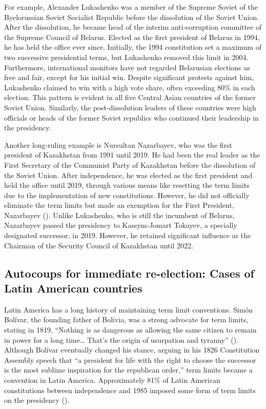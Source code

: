 \documentclass[
  12pt,
]{report}
\begin{document}
For example, Alexander Lukashenko was a member of the Supreme Soviet of
the Byelorussian Soviet Socialist Republic before the dissolution of the
Soviet Union. After the dissolution, he became head of the interim
anti-corruption committee of the Supreme Council of Belarus. Elected as
the first president of Belarus in 1994, he has held the office ever
since. Initially, the 1994 constitution set a maximum of two successive
presidential terms, but Lukashenko removed this limit in 2004.
Furthermore, international monitors have not regarded Belarusian
elections as free and fair, except for his initial win. Despite
significant protests against him, Lukashenko claimed to win with a high
vote share, often exceeding 80\% in each election. This pattern is
evident in all five Central Asian countries of the former Soviet Union.
Similarly, the post-dissolution leaders of these countries were high
officials or heads of the former Soviet republics who continued their
leadership in the presidency.

Another long-ruling example is Nursultan Nazarbayev, who was the first
president of Kazakhstan from 1991 until 2019. He had been the real
leader as the First Secretary of the Communist Party of Kazakhstan
before the dissolution of the Soviet Union. After independence, he was
elected as the first president and held the office until 2019, through
various means like resetting the term limits due to the implementation
of new constitutions. However, he did not officially eliminate the term
limits but made an exemption for the First President, Nazarbayev
(). Unlike
Lukashenko, who is still the incumbent of Belarus, Nazarbayev passed the
presidency to Kassym-Jomart Tokayev, a specially designated successor,
in 2019. However, he retained significant influence as the Chairman of
the Security Council of Kazakhstan until 2022.

\subsection{Autocoups for immediate re-election: Cases of Latin American
countries}\label{autocoups-for-immediate-re-election-cases-of-latin-american-countries}

Latin America has a long history of maintaining term limit conventions.
Simón Bolívar, the founding father of Bolivia, was a strong advocate for
term limits, stating in 1819, ``Nothing is as dangerous as allowing the
same citizen to remain in power for a long time\ldots{} That's the
origin of usurpation and tyranny'' (). Although Bolívar eventually changed his stance,
arguing in his 1826 Constitution Assembly speech that ``a president for
life with the right to choose the successor is the most sublime
inspiration for the republican order,'' term limits became a convention
in Latin America. Approximately 81\% of Latin American constitutions
between independence and 1985 imposed some form of term limits on the
presidency ().
\end{document}
